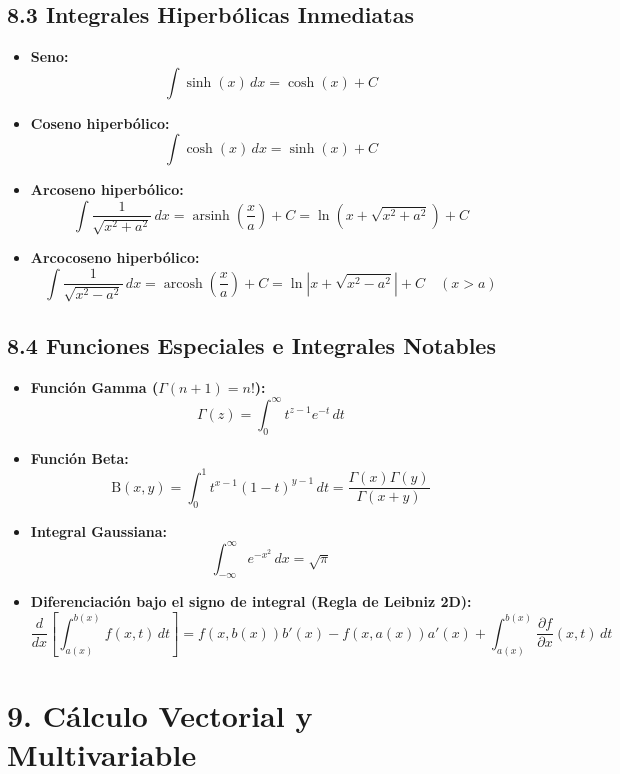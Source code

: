 \documentclass[11pt,a4paper]{article}
\begin{document}
\subsection*{8.3 Integrales Hiperbólicas Inmediatas}

\begin{itemize}
  \item \textbf{Seno:}
  \[
    \int \sinh(x) \, dx = \cosh(x) + C
  \]
  \item \textbf{Coseno hiperbólico:}
  \[
    \int \cosh(x) \, dx = \sinh(x) + C
  \]
  \item \textbf{Arcoseno hiperbólico:}
  \[
    \int \frac{1}{\sqrt{x^2 + a^2}} \, dx = \operatorname{arsinh}\left(\frac{x}{a}\right) + C = \ln\left(x + \sqrt{x^2 + a^2}\right) + C
  \]
  \item \textbf{Arcocoseno hiperbólico:}
  \[
    \int \frac{1}{\sqrt{x^2 - a^2}} \, dx = \operatorname{arcosh}\left(\frac{x}{a}\right) + C = \ln\left|x + \sqrt{x^2 - a^2}\right| + C \quad (x > a)
  \]
\end{itemize}

\subsection*{8.4 Funciones Especiales e Integrales Notables}

\begin{itemize}
  \item \textbf{Función Gamma ($\Gamma(n + 1) = n!$):}
  \[
    \Gamma(z) = \int_0^\infty t^{z-1} e^{-t} \, dt
  \]
  \item \textbf{Función Beta:}
  \[
    \text{B}(x, y) = \int_0^1 t^{x-1} (1 - t)^{y-1} \, dt = \frac{\Gamma(x)\Gamma(y)}{\Gamma(x + y)}
  \]
  \item \textbf{Integral Gaussiana:}
  \[
    \int_{-\infty}^\infty e^{-x^2} \, dx = \sqrt{\pi}
  \]
  \item \textbf{Diferenciación bajo el signo de integral (Regla de Leibniz 2D):}
  \[
    \frac{d}{dx} \left[ \int_{a(x)}^{b(x)} f(x, t) \, dt \right] = f(x, b(x))b'(x) - f(x, a(x))a'(x) + \int_{a(x)}^{b(x)} \frac{\partial f}{\partial x}(x, t) \, dt
  \]
\end{itemize}

\section*{9. Cálculo Vectorial y Multivariable}
\end{document}
